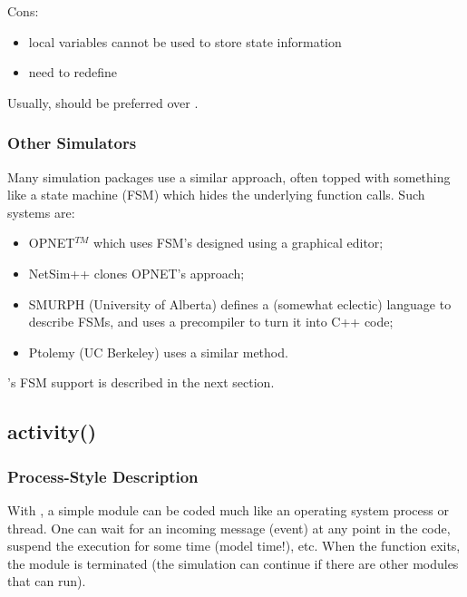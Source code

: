 Cons:
\begin{itemize}
  \item local variables cannot be used to store state information
  \item need to redefine 
\end{itemize}

Usually,  should be preferred over .


\subsubsection{Other Simulators}
\label{sec:simple-modules:handlemessage:other-simulators}

Many simulation packages use a similar approach, often topped with
something like a state machine
(FSM) which hides the underlying function calls. Such
systems are:
\begin{itemize}
  \item OPNET$^{TM}$ which uses FSM's designed using a graphical editor;
  \item NetSim++ clones OPNET's approach;
  \item SMURPH (University of Alberta) defines a (somewhat eclectic)
      language to describe FSMs, and uses a precompiler to turn it
      into C++ code;
  \item Ptolemy (UC Berkeley) uses a similar method.
\end{itemize}

{\opp}'s FSM support is described in the next section.



\subsection{activity()}
\label{sec:simple-modules:activity}

\subsubsection{Process-Style Description}
\label{sec:simple-modules:activity:overview}

With , a simple module can be coded much like an
operating system process or thread. One can wait for an incoming message
(event) at any point in the code, suspend the execution for some time
(model time!), etc. When the  function exits, the module
is terminated (the simulation can continue if there are other modules
that can run).

